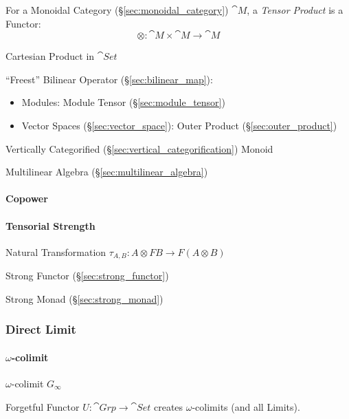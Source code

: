 For a Monoidal Category (\S\ref{sec:monoidal_category}) $\cat{M}$,
a \emph{Tensor Product} is a Functor:
\[
  \otimes : \cat{M} \times \cat{M} \rightarrow \cat{M}
\]

Cartesian Product in $\cat{Set}$

``Freest'' Bilinear Operator (\S\ref{sec:bilinear_map}):
\begin{itemize}
\item Modules: Module Tensor (\S\ref{sec:module_tensor})
\item Vector Spaces (\S\ref{sec:vector_space}): Outer Product
  (\S\ref{sec:outer_product})
\end{itemize}

Vertically Categorified (\S\ref{sec:vertical_categorification}) Monoid

Multilinear Algebra (\S\ref{sec:multilinear_algebra})



\paragraph{Copower}\label{sec:copower}\hfill

\paragraph{Tensorial Strength}\label{sec:tensorial_strength}\hfill

Natural Transformation $\tau_{A,B} : A \otimes F B \rightarrow F (A
\otimes B)$

Strong Functor (\S\ref{sec:strong_functor})

Strong Monad (\S\ref{sec:strong_monad})



\subsubsection{Direct Limit}\label{sec:direct_limit}

\paragraph{$\omega$-colimit}\label{sec:omega_colimit}\hfill

$\omega$-colimit $G_\infty$

Forgetful Functor $U : \cat{Grp} \rightarrow \cat{Set}$ creates
$\omega$-colimits (and all Limits). \cite{awodey06}



